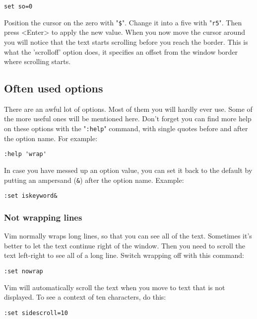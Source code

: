 \begin{Verbatim}[samepage=true]
    set so=0 
\end{Verbatim}

Position the cursor on the zero with "\verb!$!".
Change it into a five with "\verb!r5!".
Then press <Enter> to apply the new value.
When you now move the cursor around you will notice that the text starts scrolling before you reach the border.
This is what the 'scrolloff' option does, it specifies an offset from the window border where scrolling starts.

\subsection{Often used options}

There are an awful lot of options.
Most of them you will hardly ever use.
Some of the more useful ones will be mentioned here.
Don't forget you can find more help on these options with the "\verb!:help!" command, with single quotes before and after the option name.
For example:

 \begin{Verbatim}[samepage=true]
 :help 'wrap'
 \end{Verbatim}

In case you have messed up an option value, you can set it back to the default by putting an ampersand (\verb!&!) after the option name.
Example:

 \begin{Verbatim}[samepage=true]
 :set iskeyword&
 \end{Verbatim}

\subsubsection{Not wrapping lines}

Vim normally wraps long lines, so that you can see all of the text.
Sometimes it's better to let the text continue right of the window.
Then you need to scroll the text left-right to see all of a long line.
Switch wrapping off with this command:

 \begin{Verbatim}[samepage=true]
 :set nowrap
 \end{Verbatim}

Vim will automatically scroll the text when you move to text that is not displayed.
To see a context of ten characters, do this:

 \begin{Verbatim}[samepage=true]
 :set sidescroll=10
 \end{Verbatim}

